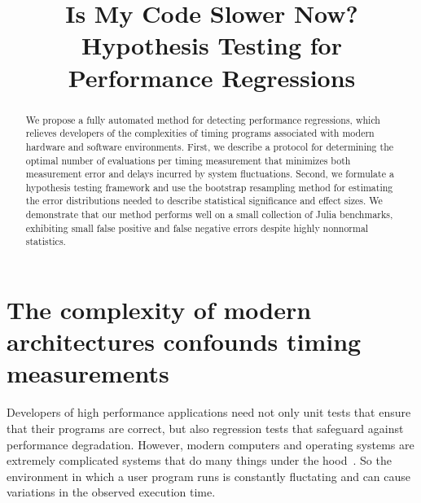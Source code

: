 \documentclass[conference]{IEEEtran}
\begin{document}
\newcommand{\TODO}[1]{\todo[inline]{#1}}
\newcommand{\TODOFIG}[1]{\missingfigure{#1}}

\title{Is My Code Slower Now? Hypothesis Testing for Performance Regressions}

\author{
}

\maketitle

\begin{abstract}
We propose a fully automated method for detecting performance regressions,
which relieves developers of the complexities of timing programs associated with
modern hardware and software environments.
First, we describe a protocol for determining the optimal number of evaluations
per timing measurement that minimizes both measurement error
and delays incurred by system fluctuations.
Second, we formulate a hypothesis testing framework and use the bootstrap
resampling method for estimating the error distributions needed to describe
statistical significance and effect sizes.
We demonstrate that our method performs well on a small collection of Julia benchmarks,
exhibiting small false positive and false negative errors despite highly nonnormal statistics.
\end{abstract}

\IEEEpeerreviewmaketitle

\label{sec:intro}
\section{The complexity of modern architectures confounds timing measurements}

Developers of high performance applications need not only unit tests that
ensure that their programs are correct, but also regression tests that safeguard
against performance degradation.
However, modern computers and operating systems are extremely complicated
systems that do many things under the hood~\cite{HP5e}. So the environment in
which a user program runs is constantly fluctating and can cause variations in
the observed execution time.
\end{document}
